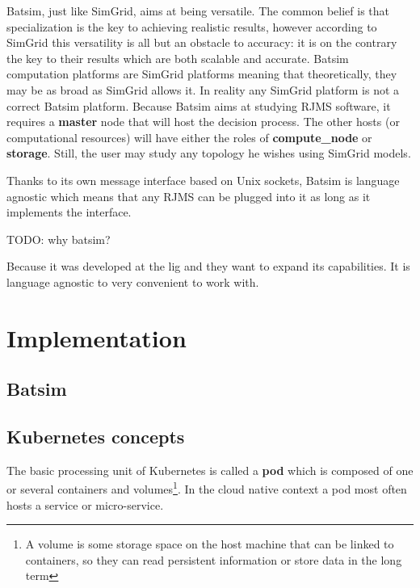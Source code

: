\documentclass[12pt, a4paper]{memoir}
\begin{document}
Batsim, just like SimGrid, aims at being versatile. The common belief is that
specialization is the key to achieving realistic results, however according to
SimGrid this versatility is all but an obstacle to
accuracy\cite{casanova:hal-01017319}: it is on the contrary the key to their
results which are both scalable and accurate. Batsim computation platforms are
SimGrid platforms meaning that theoretically, they may be as broad as SimGrid
allows it. In reality any SimGrid platform is not a correct Batsim platform.
Because Batsim aims at studying RJMS software, it requires a \textbf{master}
node that will host the decision process. The other hosts (or computational
resources) will have either the roles of \textbf{compute\_node} or
\textbf{storage}. Still, the user may study any topology he wishes using
SimGrid models.

Thanks to its own message interface based on Unix sockets, Batsim is language
agnostic which means that any RJMS can be plugged into it as long as it
implements the interface.

TODO: why batsim?

Because it was developed at the lig and they want to expand its capabilities.
It is language agnostic to very convenient to work with.

\chapter{Implementation}

\section{Batsim}

\section{Kubernetes concepts}

The basic processing unit of Kubernetes is called a \textbf{pod} which is
composed of one or several containers and volumes\footnote{A volume is some
	storage space on the host machine that can be linked to containers, so
	they can read persistent information or store data in the long term}.
In the cloud native context a pod most often hosts a service or micro-service.
\end{document}
